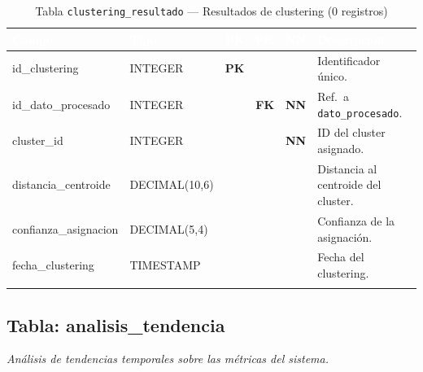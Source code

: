 \documentclass[11pt,a4paper]{article}
\newcommand{\tableheadrow}{\rowcolor{tableheader}}
\newcommand{\tablehead}[1]{\textcolor{white}{\textbf{#1}}}
\newcommand{\pk}{\textcolor{emiblue}{\textbf{PK}}}
\newcommand{\fk}{\textcolor{orange!80!black}{\textbf{FK}}}
\newcommand{\nn}{\textcolor{red!70!black}{\textbf{NN}}}
\begin{document}
\begin{longtable}{p{4.2cm} p{2.8cm} c c c p{4.5cm}}
\toprule
\tableheadrow
\tablehead{Campo} & \tablehead{Tipo} & \tablehead{PK} & \tablehead{FK} & \tablehead{NN} & \tablehead{Descripción} \\
\midrule
\endhead
id\_clustering & INTEGER & \pk & & & Identificador único. \\
\rowcolor{tablerow}
id\_dato\_procesado & INTEGER & & \fk & \nn & Ref.\ a \texttt{dato\_procesado}. \\
cluster\_id & INTEGER & & & \nn & ID del cluster asignado. \\
\rowcolor{tablerow}
distancia\_centroide & DECIMAL(10,6) & & & & Distancia al centroide del cluster. \\
confianza\_asignacion & DECIMAL(5,4) & & & & Confianza de la asignación. \\
\rowcolor{tablerow}
fecha\_clustering & TIMESTAMP & & & & Fecha del clustering. \\
\bottomrule
\caption{Tabla \texttt{clustering\_resultado} — Resultados de clustering (0 registros)}
\end{longtable}

\subsection{Tabla: analisis\_tendencia}
\textit{Análisis de tendencias temporales sobre las métricas del sistema.}
\end{document}
